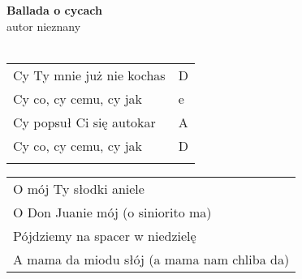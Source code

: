\documentclass[a5paper]{article}
\begin{document}


\noindent
\fontsize{12pt}{15pt}\selectfont
\textbf{Ballada o cycach} \\
\fontsize{8pt}{10pt}\selectfont
autor nieznany \\ \\
\fontsize{10pt}{12pt}\selectfont
{}
\begin{tabular}{@{}p{8cm}p{3cm}@{}}
\noindent
Cy Ty mnie już nie kochas & D \\
Cy co, cy cemu, cy jak & e \\
Cy popsuł Ci się autokar & A \\
Cy co, cy cemu, cy jak & D \\ \\
\end{tabular}

\noindent
\begin{tabular}{@{}p{9.5cm}@{}}
O mój Ty słodki aniele \\
O Don Juanie mój (o siniorito ma) \\
Pójdziemy na spacer w niedzielę \\
A mama da miodu słój (a mama nam chliba da)
\end{tabular}
\end{document}
